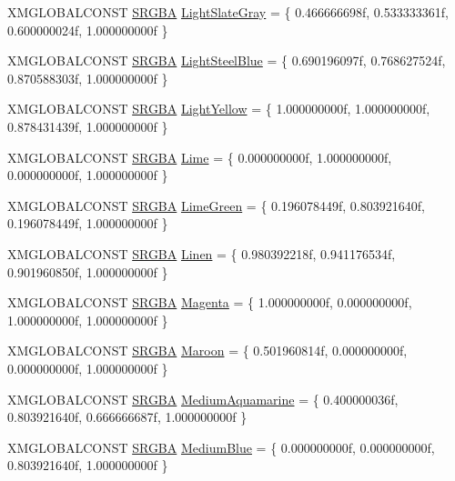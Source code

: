 \begin{DoxyCompactItemize}
X\+M\+G\+L\+O\+B\+A\+L\+C\+O\+N\+ST \hyperlink{structmage_1_1_s_r_g_b_a}{S\+R\+G\+BA} \hyperlink{namespacemage_1_1color_a3a252bf26004ec58ff18674953dc19c6}{Light\+Slate\+Gray} = \{ 0.\+466666698f, 0.\+533333361f, 0.\+600000024f, 1.\+000000000f \}
\item 
X\+M\+G\+L\+O\+B\+A\+L\+C\+O\+N\+ST \hyperlink{structmage_1_1_s_r_g_b_a}{S\+R\+G\+BA} \hyperlink{namespacemage_1_1color_a8b7fb9e3843d37cd4acca3579f2254ee}{Light\+Steel\+Blue} = \{ 0.\+690196097f, 0.\+768627524f, 0.\+870588303f, 1.\+000000000f \}
\item 
X\+M\+G\+L\+O\+B\+A\+L\+C\+O\+N\+ST \hyperlink{structmage_1_1_s_r_g_b_a}{S\+R\+G\+BA} \hyperlink{namespacemage_1_1color_ae61f91b745e7c402c59183f41419f6f5}{Light\+Yellow} = \{ 1.\+000000000f, 1.\+000000000f, 0.\+878431439f, 1.\+000000000f \}
\item 
X\+M\+G\+L\+O\+B\+A\+L\+C\+O\+N\+ST \hyperlink{structmage_1_1_s_r_g_b_a}{S\+R\+G\+BA} \hyperlink{namespacemage_1_1color_a90fd3c1444eed6c785c1b7c05c73be72}{Lime} = \{ 0.\+000000000f, 1.\+000000000f, 0.\+000000000f, 1.\+000000000f \}
\item 
X\+M\+G\+L\+O\+B\+A\+L\+C\+O\+N\+ST \hyperlink{structmage_1_1_s_r_g_b_a}{S\+R\+G\+BA} \hyperlink{namespacemage_1_1color_a5195a79b9fdc7dd1830497ef2216c678}{Lime\+Green} = \{ 0.\+196078449f, 0.\+803921640f, 0.\+196078449f, 1.\+000000000f \}
\item 
X\+M\+G\+L\+O\+B\+A\+L\+C\+O\+N\+ST \hyperlink{structmage_1_1_s_r_g_b_a}{S\+R\+G\+BA} \hyperlink{namespacemage_1_1color_afc79c14f1b57aa8e8080d9fafcb21427}{Linen} = \{ 0.\+980392218f, 0.\+941176534f, 0.\+901960850f, 1.\+000000000f \}
\item 
X\+M\+G\+L\+O\+B\+A\+L\+C\+O\+N\+ST \hyperlink{structmage_1_1_s_r_g_b_a}{S\+R\+G\+BA} \hyperlink{namespacemage_1_1color_a319f999ca5953b19abca47a2cb8bd382}{Magenta} = \{ 1.\+000000000f, 0.\+000000000f, 1.\+000000000f, 1.\+000000000f \}
\item 
X\+M\+G\+L\+O\+B\+A\+L\+C\+O\+N\+ST \hyperlink{structmage_1_1_s_r_g_b_a}{S\+R\+G\+BA} \hyperlink{namespacemage_1_1color_af4e34c6efa6723a5f7a0e0290583d137}{Maroon} = \{ 0.\+501960814f, 0.\+000000000f, 0.\+000000000f, 1.\+000000000f \}
\item 
X\+M\+G\+L\+O\+B\+A\+L\+C\+O\+N\+ST \hyperlink{structmage_1_1_s_r_g_b_a}{S\+R\+G\+BA} \hyperlink{namespacemage_1_1color_a70e3d4dcf5644641bab05c9ff4e17d54}{Medium\+Aquamarine} = \{ 0.\+400000036f, 0.\+803921640f, 0.\+666666687f, 1.\+000000000f \}
\item 
X\+M\+G\+L\+O\+B\+A\+L\+C\+O\+N\+ST \hyperlink{structmage_1_1_s_r_g_b_a}{S\+R\+G\+BA} \hyperlink{namespacemage_1_1color_acc9024a2f7200f942578b882300265b0}{Medium\+Blue} = \{ 0.\+000000000f, 0.\+000000000f, 0.\+803921640f, 1.\+000000000f \}

\end{DoxyCompactItemize}
